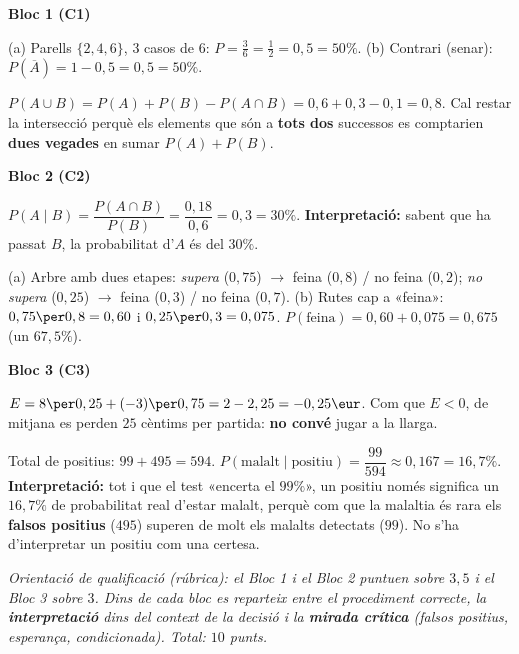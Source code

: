 \newpage
\begin{solucions}

\noindent\textbf{Bloc 1 (C1)}
\begin{sollist}
  \item (a) Parells $\{2,4,6\}$, $3$ casos de $6$:
        $P=\frac{3}{6}=\frac{1}{2}=0,5=50\%$. \quad
        (b) Contrari (senar): $P(\overline{A})=1-0,5=0,5=50\%$.
  \item $P(A\cup B)=P(A)+P(B)-P(A\cap B)=0,6+0,3-0,1=0,8$. Cal restar la intersecció
        perquè els elements que són a \textbf{tots dos} successos es comptarien
        \textbf{dues vegades} en sumar $P(A)+P(B)$.
\end{sollist}

\noindent\textbf{Bloc 2 (C2)}
\begin{sollist}\setcounter{enumi}{2}
  \item $P(A\mid B)=\dfrac{P(A\cap B)}{P(B)}=\dfrac{0,18}{0,6}=0,3=30\%$.
        \textbf{Interpretació:} sabent que ha passat $B$, la probabilitat d'$A$ és del
        $30\%$.
  \item (a) Arbre amb dues etapes: \emph{supera} ($0,75$) $\rightarrow$ feina ($0,8$) /
        no feina ($0,2$); \emph{no supera} ($0,25$) $\rightarrow$ feina ($0,3$) / no
        feina ($0,7$). \quad
        (b) Rutes cap a «feina»: $0,75\per 0,8=0,60$ i $0,25\per 0,3=0,075$.
        $P(\text{feina})=0,60+0,075=0,675$ (un $67,5\%$).
\end{sollist}

\noindent\textbf{Bloc 3 (C3)}
\begin{sollist}\setcounter{enumi}{4}
  \item $E=8\per 0,25+(-3)\per 0,75=2-2,25=-0,25\eur$. Com que $E<0$, de mitjana es
        perden $25$ cèntims per partida: \textbf{no convé} jugar a la llarga.
  \item Total de positius: $99+495=594$.
        $P(\text{malalt}\mid\text{positiu})=\dfrac{99}{594}\approx 0,167=16,7\%$.
        \textbf{Interpretació:} tot i que el test «encerta el $99\%$», un positiu només
        significa un $16,7\%$ de probabilitat real d'estar malalt, perquè com que la
        malaltia és rara els \textbf{falsos positius} ($495$) superen de molt els
        malalts detectats ($99$). No s'ha d'interpretar un positiu com una certesa.
\end{sollist}

\end{solucions}

\noindent\small\textit{Orientació de qualificació (rúbrica): el Bloc 1 i el Bloc 2
puntuen sobre $3,5$ i el Bloc 3 sobre $3$. Dins de cada bloc es reparteix entre el
procediment correcte, la \textbf{interpretació} dins del context de la decisió i la
\textbf{mirada crítica} (falsos positius, esperança, condicionada). Total: $10$ punts.}
